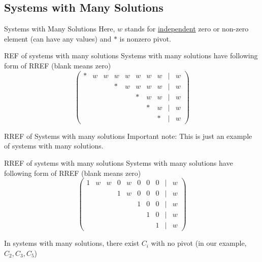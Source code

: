 \documentclass[a4paper,11pt]{article}
\begin{document}
\subsection{Systems with Many Solutions} %
\label{sub:systems_with_many_solutions}
\begin{frame}[t]{Systems with Many Solutions}
	Here, $w$ stands for \uline{independent} zero or non-zero element (can have any values) and $\ast$ is nonzero pivot.
	
	\begin{block}
		{REF of systems with many solutions}
		Systems with many solutions have following form of RREF (blank means zero)
		\[
			\tag{REF} \begin{pmatrix} 
				\ast & w& w& w& w& w& w& w& \vert&w\\
				&&&\ast&w& w& w& w& \vert&w\\
				&&&&&\ast&w& w& \vert&w\\
				&&&&&&\ast&w& \vert&w\\
				&&&&&&&\ast&\vert&w
			\end{pmatrix}
		\]
	\end{block}
\end{frame}
\begin{frame}[t]{RREF of Systems with many solutions}
	Important note: This is just an example of systems with many solutions. 
	\begin{block}
		{RREF of systems with many solutions}
		Systems with many solutions have following form of RREF (blank means zero)
		\[
			\tag{RREF} \begin{pmatrix} 
				1 & w& w& 0& w& 0& 0& 0& \vert&w\\
				&&&1&w& 0& 0& 0& \vert&w\\
				&&&&&1&0& 0& \vert&w\\
				&&&&&&1&0& \vert&w\\
				&&&&&&&1&\vert&w
			\end{pmatrix}
		\]
	\end{block}
In systems with many solutions, there exist $C_i$ with no pivot (in our example, $C_2,C_3,C_5$)
\end{frame}
\end{document}

